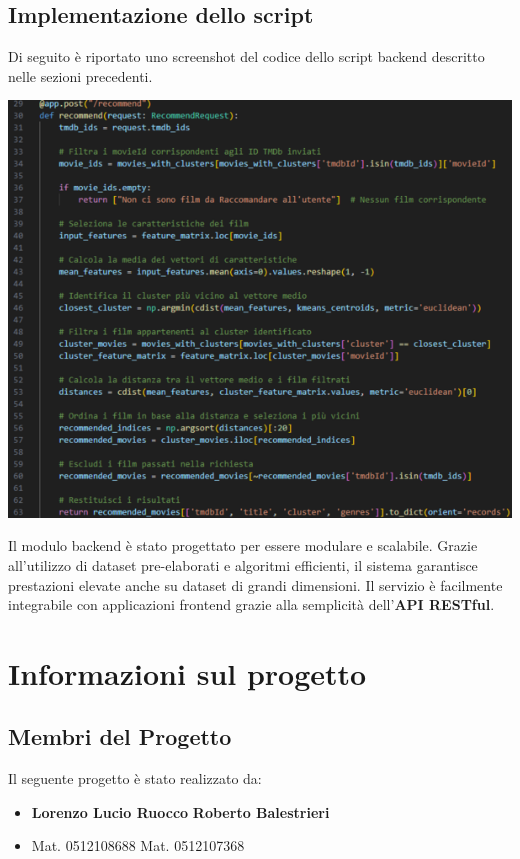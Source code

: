 \documentclass[a4paper,12pt]{article}
\begin{document}
\subsection{Implementazione dello script}
Di seguito è riportato uno screenshot del codice dello script backend descritto nelle sezioni precedenti.
\begin{center}
    \includegraphics[]{./grafici/backend.png}
\end{center}
Il modulo backend è stato progettato per essere modulare e scalabile. Grazie all'utilizzo di dataset pre-elaborati e algoritmi efficienti, il sistema garantisce prestazioni elevate anche su dataset di grandi dimensioni. Il servizio è facilmente integrabile con applicazioni frontend grazie alla semplicità dell'\textbf{API RESTful}.

\section{Informazioni sul progetto}
	\subsection{Membri del Progetto}
	Il seguente progetto è stato realizzato da:  
\begin{itemize}
\item[] \textbf{Lorenzo Lucio Ruocco}\hspace{2cm}
            \textbf{Roberto Balestrieri}
	\vspace{-0.5cm}
\item[] Mat. 0512108688 \hspace{3.4cm}
	  Mat. 0512107368
\end{itemize}
\end{document}
